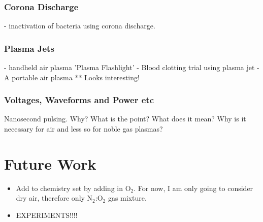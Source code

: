 \documentclass[11pt, oneside]{article}   	%
\begin{document}
\subsubsection{Corona Discharge}
\cite{Dobrynin2011inactivation} - inactivation of bacteria using corona discharge.

\subsubsection{Plasma Jets}
\cite{Pei2012inactivation} - handheld air plasma 'Plasma Flashlight'
\cite{Chen2009blood} - Blood clotting trial using plasma jet
\cite{Walsh2011portable} - A portable air plasma ** Looks interesting!


\subsubsection{Voltages, Waveforms and Power etc}

Nanosecond pulsing.
Why? What is the point? What does it mean? Why is it necessary for air and less so for noble gas plasmas?



\section{Future Work}
\begin{itemize}
\item Add to chemistry set by adding in O$_2$. For now, I am only going to consider dry air, therefore only N$_2$:O$_2$ gas mixture.
\item EXPERIMENTS!!!!
\end{itemize}



\scriptsize


\end{document}
